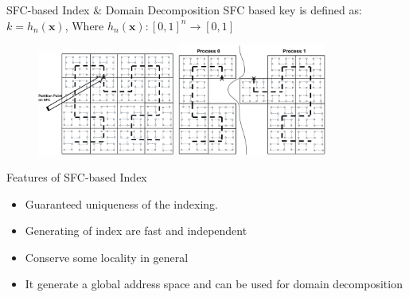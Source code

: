 \documentclass{beamer}
\begin{document}
\begin{frame}{SFC-based Index $\&$ Domain Decomposition}
SFC based key is defined as: $k = h_n (\textbf{x})$, Where $h_n (\textbf{x}): [0,1]^n \rightarrow [0,1]$
\begin{figure}
\flushleft
\includegraphics[width=0.405\textwidth]{../SFC_particles_buckets}
\hfill
\includegraphics[width=0.435\textwidth]{../SFC_particles_buckets_partition}
\end{figure}
\begin{block}{Features of SFC-based Index}
  \begin{itemize}
  \item {
    Guaranteed uniqueness of the indexing.
  }
  \item {
    Generating of index are fast and
independent
  }
  \item {
    Conserve some locality in general
  }
  \item {
    It generate a global address space and can be used for domain decomposition
  }
  \end{itemize}
\end{block}
\end{frame}
\end{document}
